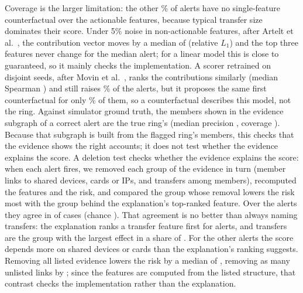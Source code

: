 Coverage is the larger limitation: the other \TwelveNoCfShare\% of alerts have
no single-feature counterfactual over the actionable features, because typical
transfer size dominates their score. Under 5\% noise in non-actionable
features, after Artelt et al.~\cite{artelt2021robustness}, the contribution
vector moves by a median of \TwelveDriftFive{} (relative $L_1$) and the top
three features never change for the median alert; for a linear model this is
close to guaranteed, so it mainly checks the implementation. A scorer retrained
on disjoint seeds, after Movin et al.~\cite{movin2025acdc}, ranks the
contributions similarly (median Spearman \TwelveSpearman{}) and still raises
\TwelveStillAlert\% of the alerts, but it proposes the same first
counterfactual for only \TwelveCfSame\% of them, so a counterfactual describes
this model, not the ring. Against simulator ground truth, the members shown in
the evidence subgraph of a correct alert are the true ring's (median precision
\TwelveFidPrec{}, coverage \TwelveFidCov{}). Because that subgraph is built from
the flagged ring's members, this checks that the evidence shows the right
accounts; it does not test whether the evidence explains the score. A
deletion test checks whether the evidence explains the score: when each alert
fires, we removed each group of the evidence in turn (member links to shared
devices, cards or IPs, and transfers among members), recomputed the features
and the risk, and compared the group whose removal lowers the risk most with
the group behind the explanation's top-ranked feature. Over the \RfDelAlerts{}
alerts they agree in \RfDelAgree{} of cases (chance \RfDelChance{}). That
agreement is no better than always naming transfers: the explanation ranks a
transfer feature first for \RfDelTopTransfers{} alerts, and transfers are the
group with the largest effect in a share of \RfDelMajority{}. For the other
\RfDelOtherN{} alerts the score depends more on shared devices or cards than
the explanation's ranking suggests. Removing all listed evidence lowers the
risk by a median of \RfDelListed{}, removing as many unlisted links by
\RfDelUnlisted{}; since the features are computed from the listed structure,
that contrast checks the implementation rather than the explanation.

